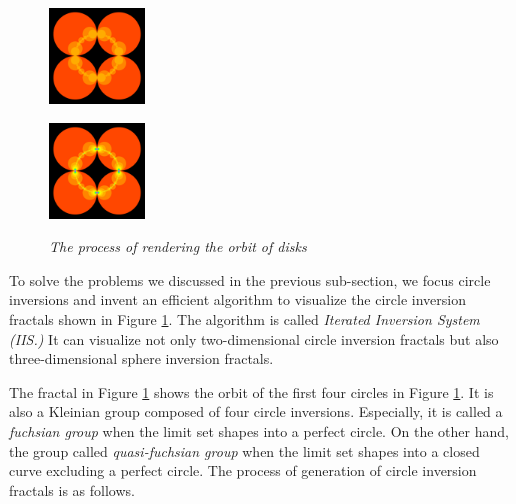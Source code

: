 \begin{figure}[htbp]
 \begin{minipage}[t]{0.16\hsize}
  \center
  \includegraphics[width=1in, height=1in, keepaspectratio]{./img/preparation/orbit/level2c.pdf}
  \subcaption{}
  \label{fig:level2}
 \end{minipage}
 \begin{minipage}[t]{0.16\hsize}
  \center
  \includegraphics[width=1in, height=1in, keepaspectratio]{img/preparation/orbit/levelMaxc.pdf}
  \subcaption{}
  \label{fig:levelMax}
 \end{minipage}
 \caption{\textit{The process of rendering the orbit of disks}}
 \label{fig:schottkyProcess}
\end{figure}

\noindent To solve the problems we discussed in the previous sub-section,
we focus circle inversions and invent an efficient algorithm to
visualize the circle inversion fractals shown in Figure \ref{fig:schottkyProcess}.
The algorithm is called \textit{Iterated Inversion System (IIS.)}
It can visualize not only two-dimensional circle inversion fractals but
also three-dimensional sphere inversion fractals.

The fractal in Figure \ref{fig:schottkyProcess} shows the orbit of the first
four circles in Figure \ref{fig:schottkyProcess}.
It is also a Kleinian group composed of four circle inversions.
Especially, it is called a \textit{fuchsian group} when the limit set
shapes into a perfect circle.
On the other hand, the group called \textit{quasi-fuchsian group}
when the limit set shapes into a closed curve excluding a perfect circle.
The process of generation of circle inversion fractals is
as follows.

